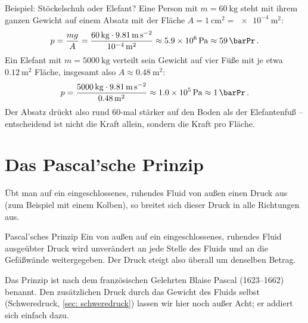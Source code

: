 \begin{examplebox}[]{Beispiel: Stöckelschuh oder Elefant?}
    Eine Person mit $m = \SI{60}{\kilo\gram}$ steht mit ihrem ganzen Gewicht auf einem Absatz mit der Fläche $A = \SI{1}{\centi\meter\squared} = \SI{e-4}{\meter\squared}$:
    \begin{equation*}
        p = \frac{m g}{A} = \frac{\SI{60}{\kilo\gram} \cdot \SI{9.81}{\meter\per\second\squared}}{\SI{e-4}{\meter\squared}} \approx \SI{5.9e6}{\pascal} \approx \SI{59}{\barPr} \mDot
    \end{equation*}
    Ein Elefant mit $m = \SI{5000}{\kilo\gram}$ verteilt sein Gewicht auf vier Füße mit je etwa $\SI{0.12}{\meter\squared}$ Fläche, insgesamt also $A \approx \SI{0.48}{\meter\squared}$:
    \begin{equation*}
        p = \frac{\SI{5000}{\kilo\gram} \cdot \SI{9.81}{\meter\per\second\squared}}{\SI{0.48}{\meter\squared}} \approx \SI{1.0e5}{\pascal} \approx \SI{1}{\barPr} \mDot
    \end{equation*}
    Der Absatz drückt also rund 60-mal stärker auf den Boden als der Elefantenfuß -- entscheidend ist nicht die Kraft allein, sondern die Kraft pro Fläche.
\end{examplebox}

\section{Das Pascal'sche Prinzip}\label{sec: pascal}
Übt man auf ein eingeschlossenes, ruhendes Fluid von außen einen Druck aus (zum Beispiel mit einem Kolben), so breitet sich dieser Druck in alle Richtungen aus.
\begin{rememberbox}{Pascal'sches Prinzip}
    Ein von außen auf ein eingeschlossenes, ruhendes Fluid ausgeübter Druck wird unverändert an jede Stelle des Fluids und an die Gefäßwände weitergegeben. Der Druck steigt also überall um denselben Betrag.
\end{rememberbox}
Das Prinzip ist nach dem französischen Gelehrten Blaise Pascal (1623--1662) benannt. Den zusätzlichen Druck durch das Gewicht des Fluids selbst (Schweredruck, \cref{sec: schweredruck}) lassen wir hier noch außer Acht; er addiert sich einfach dazu.

